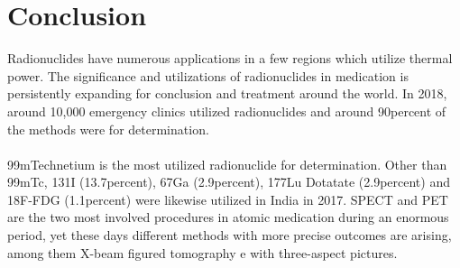 \documentclass[12pt]{article}
\begin{document}
\section{Conclusion}
Radionuclides have numerous applications in a few regions which utilize thermal power. The significance and utilizations of radionuclides in medication is persistently expanding for conclusion and treatment around the world. In 2018, around 10,000 emergency clinics utilized radionuclides and around 90percent of the methods were for determination.
\\
\\
99mTechnetium is the most utilized radionuclide for determination. Other than 99mTc, 131I (13.7percent), 67Ga (2.9percent), 177Lu Dotatate (2.9percent) and 18F-FDG (1.1percent) were likewise utilized in India in 2017. SPECT and PET are the two most involved procedures in atomic medication during an enormous period, yet these days different methods with more precise outcomes are arising, among them X-beam figured tomography e with three-aspect pictures.
\\
\end{document}
